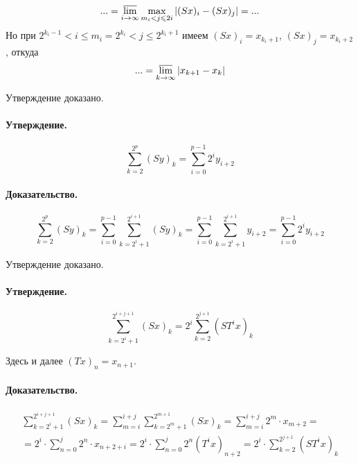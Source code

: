 \begin{equation*}
	... =
	\varlimsup_{i\to\infty}
		\max_{m_i < j \leq 2i } | (Sx)_i - (Sx)_j |
	=
	...
\end{equation*}
Но при $2^{k_i - 1} < i \leq m_i = 2^{k_i} < j \leq 2^{k_i+1}$
имеем $(Sx)_i = x_{k_i+1}$, $(Sx)_j = x_{k_i+2}$, откуда
\begin{equation}\label{alpha_S_sosedi}
	... =
	\varlimsup_{k\to\infty}
		| x_{k+1} - x_k |
\end{equation}

Утверждение доказано.

\paragraph{Утверждение.}
\begin{equation}\label{summa_S_less}
	\sum_{k=2}^{2^p} (Sy)_k =
	\sum_{i=0}^{p-1} 2^i y_{i+2}
\end{equation}

\paragraph{Доказательство.}

\begin{equation*}
	\sum_{k=2}^{2^p} (Sy)_k =
	\sum_{i=0}^{p-1} \sum_{k=2^i+1}^{2^{i+1}} (Sy)_k =
	\sum_{i=0}^{p-1} \sum_{k=2^i+1}^{2^{i+1}} y_{i+2} =
	\sum_{i=0}^{p-1} 2^i y_{i+2}
\end{equation*}

Утверждение доказано.


\paragraph{Утверждение.}
\begin{equation}\label{summa_S}
	\sum_{k=2^i+1}^{2^{i+j+1}} (Sx)_k =
	2^i\sum_{k=2}^{2^{j+1}} (ST^ix)_k
\end{equation}

Здесь и далее $(Tx)_n = x_{n+1}$.

\paragraph{Доказательство.}

\begin{multline*}
	\sum_{k=2^i+1}^{2^{i+j+1}} (Sx)_k =
	\sum_{m = i}^{i+j}\sum_{k=2^m+1}^{2^{m+1}} (Sx)_k =
	\sum_{m = i}^{i+j}2^m \cdot x_{m+2} =
	\\=
	2^i \cdot \sum_{n = 0}^{j}2^n \cdot x_{n+2+i} =
	2^i \cdot \sum_{n = 0}^{j}2^n (T^i x)_{n+2} =
	2^i \cdot \sum_{k=2}^{2^{j+1}} (ST^i x)_k
\end{multline*}


